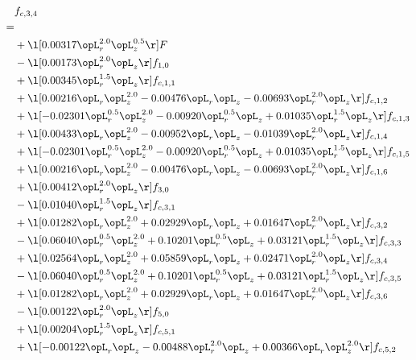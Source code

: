 \begin{alignat}{2} 
\label{eq:f_34_1} 
& f_{c,3,4} \nonumber \\ 
 = \\ 
& + \l[  0.00317 \opL_r^{2.0} \opL_z^{0.5}  \r] F \nonumber \\ 
& - \l[  0.00173 \opL_r^{2.0} \opL_z  \r] f_{1,0} \nonumber \\ 
& + \l[  0.00345 \opL_r^{1.5} \opL_z  \r] f_{c,1,1} \nonumber \\ 
& + \l[  0.00216 \opL_r \opL_z^{2.0}   -0.00476 \opL_r \opL_z   -0.00693 \opL_r^{2.0} \opL_z  \r] f_{c,1,2} \nonumber \\ 
& + \l[  -0.02301 \opL_r^{0.5} \opL_z^{2.0}   -0.00920 \opL_r^{0.5} \opL_z +  0.01035 \opL_r^{1.5} \opL_z  \r] f_{c,1,3} \nonumber \\ 
& + \l[  0.00433 \opL_r \opL_z^{2.0}   -0.00952 \opL_r \opL_z   -0.01039 \opL_r^{2.0} \opL_z  \r] f_{c,1,4} \nonumber \\ 
& + \l[  -0.02301 \opL_r^{0.5} \opL_z^{2.0}   -0.00920 \opL_r^{0.5} \opL_z +  0.01035 \opL_r^{1.5} \opL_z  \r] f_{c,1,5} \nonumber \\ 
& + \l[  0.00216 \opL_r \opL_z^{2.0}   -0.00476 \opL_r \opL_z   -0.00693 \opL_r^{2.0} \opL_z  \r] f_{c,1,6} \nonumber \\ 
& + \l[  0.00412 \opL_r^{2.0} \opL_z  \r] f_{3,0} \nonumber \\ 
& - \l[  0.01040 \opL_r^{1.5} \opL_z  \r] f_{c,3,1} \nonumber \\ 
& + \l[  0.01282 \opL_r \opL_z^{2.0} +  0.02929 \opL_r \opL_z +  0.01647 \opL_r^{2.0} \opL_z  \r] f_{c,3,2} \nonumber \\ 
& - \l[  0.06040 \opL_r^{0.5} \opL_z^{2.0} +  0.10201 \opL_r^{0.5} \opL_z +  0.03121 \opL_r^{1.5} \opL_z  \r] f_{c,3,3} \nonumber \\ 
& + \l[  0.02564 \opL_r \opL_z^{2.0} +  0.05859 \opL_r \opL_z +  0.02471 \opL_r^{2.0} \opL_z  \r] f_{c,3,4} \nonumber \\ 
& - \l[  0.06040 \opL_r^{0.5} \opL_z^{2.0} +  0.10201 \opL_r^{0.5} \opL_z +  0.03121 \opL_r^{1.5} \opL_z  \r] f_{c,3,5} \nonumber \\ 
& + \l[  0.01282 \opL_r \opL_z^{2.0} +  0.02929 \opL_r \opL_z +  0.01647 \opL_r^{2.0} \opL_z  \r] f_{c,3,6} \nonumber \\ 
& - \l[  0.00122 \opL_r^{2.0} \opL_z  \r] f_{5,0} \nonumber \\ 
& + \l[  0.00204 \opL_r^{1.5} \opL_z  \r] f_{c,5,1} \nonumber \\ 
& + \l[  -0.00122 \opL_r \opL_z   -0.00488 \opL_r^{2.0} \opL_z +  0.00366 \opL_r \opL_z^{2.0}  \r] f_{c,5,2} \nonumber \\ 

\end{alignat}
